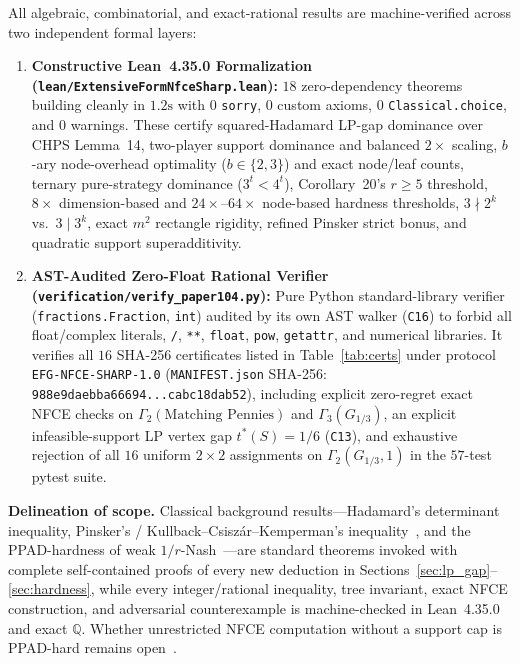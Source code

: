 \documentclass[11pt,a4paper]{article}
\theoremstyle{remark}
\newcommand{\Q}{\mathbb{Q}}
\begin{document}
All algebraic, combinatorial, and exact-rational results are machine-verified across two independent formal layers:
\begin{enumerate}
  \item \textbf{Constructive Lean~4.35.0 Formalization (\nolinkurl{lean/ExtensiveFormNfceSharp.lean}):} $18$ zero-dependency theorems building cleanly in $1.2\text{s}$ with $0$ \texttt{sorry}, $0$ custom axioms, $0$ \texttt{Classical.choice}, and $0$ warnings. These certify squared-Hadamard LP-gap dominance over CHPS Lemma~14, two-player support dominance and balanced $2\times$ scaling, $b$-ary node-overhead optimality ($b\in\{2,3\}$) and exact node/leaf counts, ternary pure-strategy dominance ($3^t < 4^t$), Corollary~20's $r \ge 5$ threshold, $8\times$ dimension-based and $24\times$--$64\times$ node-based hardness thresholds, $3 \nmid 2^k$ vs.\ $3 \mid 3^k$, exact $m^2$ rectangle rigidity, refined Pinsker strict bonus, and quadratic support superadditivity.
  \item \textbf{AST-Audited Zero-Float Rational Verifier (\nolinkurl{verification/verify_paper104.py}):} Pure Python standard-library verifier (\texttt{fractions.Fraction}, \texttt{int}) audited by its own AST walker (\texttt{C16}) to forbid all float/complex literals, \texttt{/}, \texttt{**}, \texttt{float}, \texttt{pow}, \texttt{getattr}, and numerical libraries. It verifies all $16$ SHA-256 certificates listed in Table~\ref{tab:certs} under protocol \texttt{EFG-NFCE-SHARP-1.0} (\texttt{MANIFEST.json} SHA-256: \nolinkurl{988e9daebba66694...cabc18dab52}), including explicit zero-regret exact NFCE checks on $\Gamma_2(\text{Matching Pennies})$ and $\Gamma_3(G_{1/3})$, an explicit infeasible-support LP vertex gap $t^*(S)=1/6$ (\texttt{C13}), and exhaustive rejection of all $16$ uniform $2{\times}2$ assignments on $\Gamma_2(G_{1/3}, 1)$ in the $57$-test pytest suite.
\end{enumerate}

\noindent\textbf{Delineation of scope.} Classical background results---Hadamard's determinant inequality, Pinsker's / Kullback--Csisz\'ar--Kemperman's inequality~\cite{FHT2003}, and the PPAD-hardness of weak $1/r$-Nash~\cite{CDT2009}---are standard theorems invoked with complete self-contained proofs of every new deduction in Sections~\ref{sec:lp_gap}--\ref{sec:hardness}, while every integer/rational inequality, tree invariant, exact NFCE construction, and adversarial counterexample is machine-checked in Lean~4.35.0 and exact $\Q$. Whether unrestricted NFCE computation without a support cap is PPAD-hard remains open~\cite{CHPS2026}.
\end{document}
